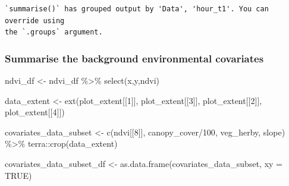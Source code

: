\documentclass[
  letterpaper,
  DIV=11,
  numbers=noendperiod]{scrartcl}
\newenvironment{Shaded}{\begin{snugshade}}{\end{snugshade}}
\newcommand{\AttributeTok}[1]{\textcolor[rgb]{0.40,0.45,0.13}{#1}}
\newcommand{\ConstantTok}[1]{\textcolor[rgb]{0.56,0.35,0.01}{#1}}
\newcommand{\DecValTok}[1]{\textcolor[rgb]{0.68,0.00,0.00}{#1}}
\newcommand{\FunctionTok}[1]{\textcolor[rgb]{0.28,0.35,0.67}{#1}}
\newcommand{\NormalTok}[1]{\textcolor[rgb]{0.00,0.23,0.31}{#1}}
\newcommand{\OtherTok}[1]{\textcolor[rgb]{0.00,0.23,0.31}{#1}}
\newcommand{\SpecialCharTok}[1]{\textcolor[rgb]{0.37,0.37,0.37}{#1}}
\begin{document}
\begin{verbatim}
`summarise()` has grouped output by 'Data', 'hour_t1'. You can override using
the `.groups` argument.
\end{verbatim}

\subsubsection{Summarise the background environmental
covariates}\label{summarise-the-background-environmental-covariates}

\begin{Shaded}
\begin{Highlighting}[]
\NormalTok{ndvi\_df }\OtherTok{\textless{}{-}}\NormalTok{ ndvi\_df }\SpecialCharTok{\%\textgreater{}\%} \FunctionTok{select}\NormalTok{(x,y,ndvi)}

\NormalTok{data\_extent }\OtherTok{\textless{}{-}} \FunctionTok{ext}\NormalTok{(plot\_extent[[}\DecValTok{1}\NormalTok{]], plot\_extent[[}\DecValTok{3}\NormalTok{]], plot\_extent[[}\DecValTok{2}\NormalTok{]], plot\_extent[[}\DecValTok{4}\NormalTok{]])}

\NormalTok{covariates\_data\_subset }\OtherTok{\textless{}{-}} \FunctionTok{c}\NormalTok{(ndvi[[}\DecValTok{8}\NormalTok{]], }
\NormalTok{                            canopy\_cover}\SpecialCharTok{/}\DecValTok{100}\NormalTok{, }
\NormalTok{                            veg\_herby, }
\NormalTok{                            slope) }\SpecialCharTok{\%\textgreater{}\%}\NormalTok{ terra}\SpecialCharTok{::}\FunctionTok{crop}\NormalTok{(data\_extent)}

\NormalTok{covariates\_data\_subset\_df }\OtherTok{\textless{}{-}} \FunctionTok{as.data.frame}\NormalTok{(covariates\_data\_subset, }\AttributeTok{xy =} \ConstantTok{TRUE}\NormalTok{) }


\end{Highlighting}
\end{Shaded}
\end{document}
